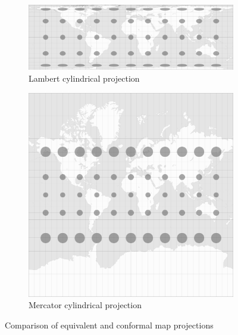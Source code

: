 \begin{figure}[ht]
  \centering
  \begin{subfigure}{0.59\textwidth}
    \centering
    \includegraphics[width=0.9\linewidth]{graphics/basics/projection_distortion_lambert.png}
    \caption{Lambert cylindrical projection \protect\footnotemark}
  \end{subfigure}
  \begin{subfigure}{0.39\textwidth}
    \centering
    \includegraphics[width=0.9\linewidth]{graphics/basics/projection_distortion_mercator.png}
    \caption{Mercator cylindrical projection \protect\footnotemark}
  \end{subfigure}
  \caption{Comparison of equivalent and conformal map projections}
  \label{fig:lambert_vs_mercator}
\end{figure}

\addtocounter{footnote}{-1}

